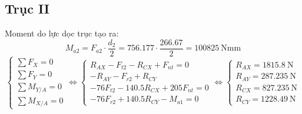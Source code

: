 \subsection{Trục II}
Moment do lực dọc trục tạo ra:
\[
    M_{a2} = F_{a2} \cdot \frac{d_2}{2} 
           = 756.177 \cdot \frac{266.67}{2} 
           = 100825\ \text{Nmm}
\]
\[
    \left\{
    \begin{array}{l}
        \sum F_X = 0 \\
        \sum F_Y = 0 \\
        \sum M_{Y/A} = 0 \\
        \sum M_{X/A} = 0
    \end{array}
    \right.
    \Leftrightarrow
    \left\{
    \begin{array}{l}
        R_{AX} - F_{t2} - R_{CX} + F_{nt} = 0 \\
        -R_{AY} - F_{r2} + R_{CY} \\
        -76 F_{t2} - 140.5 R_{CX} + 205 F_{nt} = 0 \\
        -76 F_{r2} + 140.5 R_{CY} - M_{a1} = 0
    \end{array}
    \right.
    \Leftrightarrow
    \left\{
    \begin{array}{l}
        R_{AX} = 1815.8\ \text{N} \\
        R_{AY} = 287.235\ \text{N} \\
        R_{CX} = 827.235\ \text{N} \\
        R_{CY} = 1228.49\ \text{N}
    \end{array}
    \right.
\]
